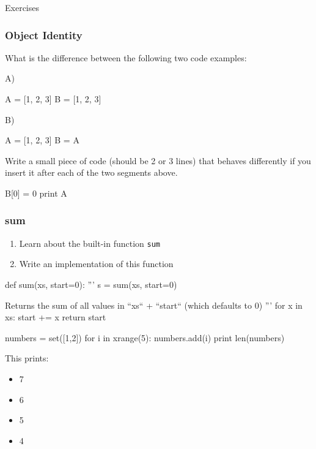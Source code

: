 \begin{frame}
{}

\bigskip
\bigskip
\bigskip
Exercises
\end{frame}

\begin{frame}[fragile]
\frametitle{Object Identity}

What is the difference between the following two code examples:

A)
\begin{python}
A = [1, 2, 3]
B = [1, 2, 3]
\end{python}

B)

\begin{python}
A = [1, 2, 3]
B = A
\end{python}

Write a small piece of code (should be 2 or 3 lines) that behaves differently
if you insert it after each of the two segments above.

\pause

\begin{python}
B[0] = 0
print A
\end{python}

\end{frame}


\begin{frame}[fragile]
\frametitle{sum}
\begin{enumerate}
\item Learn about the built-in function \lstinline{sum}
\item Write an implementation of this function
\end{enumerate}

\pause
\begin{python}
def sum(xs, start=0):
    '''
    s = sum(xs, start=0)

    Returns the sum of all values in ``xs`` + ``start`` (which defaults to 0)
    '''
    for x in xs:
        start += x
    return start
\end{python}
\end{frame}

\begin{frame}[fragile]
\begin{python}
numbers = set([1,2])
for i in xrange(5):
    numbers.add(i)
print len(numbers)
\end{python}

This prints:

\begin{itemize}
\item 7
\item 6
\item 5
\item 4
\end{itemize}
\end{frame}



